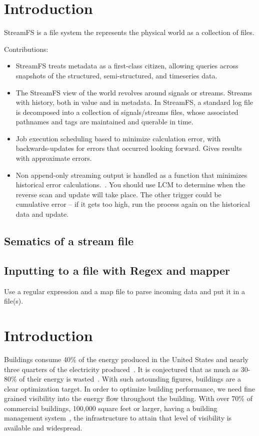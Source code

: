 \section{Introduction}
StreamFS is a file system the represents the physical world as a collection of files.  

Contributions:
\begin{itemize}
\item StreamFS treats metadata as a first-class citizen, allowing queries across snapshots of the structured, semi-structured,
and timeseries data.

\item The StreamFS view of the world revolves around signals or streams.  Streams with history, both in value and in metadata.  
In StreamFS, a standard log file is decomposed into a collection of signals/streams files, whose associated pathnames and tags
are maintained and querable in time.

\item Job execution scheduling based to minimize calculation error, with backwards-updates for errors that occurred looking forward.
		Gives results with approximate errors.

\item Non append-only streaming output is handled as a function that minimizes historical error calculations.~\cite{syncsql}.
		You should use LCM to determine when the reverse scan and update will take place.  The other trigger could be 
		cumulative error -- if it gets too high, run the process again on the historical data and update.


\end{itemize}


\subsection{Sematics of a stream file}

\subsection{Inputting to a file with Regex and mapper}
Use a regular expression and a map file to parse incoming data and put it in a file(s).

\section{Introduction}%
Buildings consume 40\% of the energy produced in the United States and nearly three quarters of 
the electricity produced~\cite{epabuildings}.  It is conjectured that as much as 30-80\% of their energy is 
wasted~\cite{waste_science, next10_waste}.  With such astounding figures, buildings are a clear optimization
target.  In order to optimize building performance, we need fine grained visibility into the energy flow
throughout the building.  With over 70\% of commercial buildings, 100,000 square feet or 
larger, having a building management system~\cite{cbecs2003}, the infrastructure to attain that level of 
visibility is available and widespread.  

